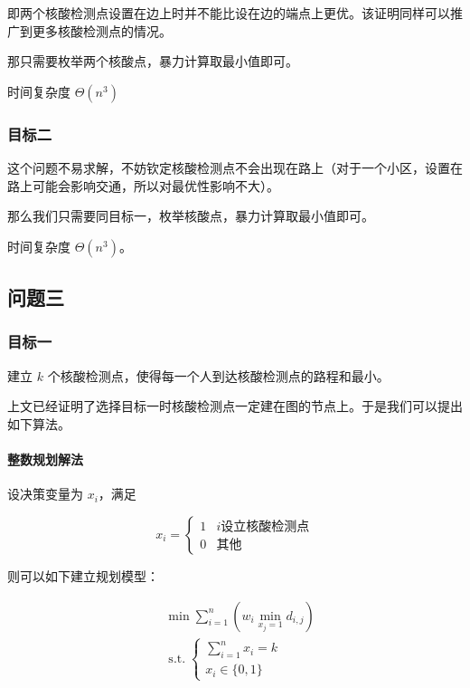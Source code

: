\documentclass{cumcmthesis}
\begin{document}
即两个核酸检测点设置在边上时并不能比设在边的端点上更优。该证明同样可以推广到更多核酸检测点的情况。

那只需要枚举两个核酸点，暴力计算取最小值即可。

时间复杂度 $\Theta(n^3)$

\subsubsection{目标二}

这个问题不易求解，不妨钦定核酸检测点不会出现在路上（对于一个小区，设置在路上可能会影响交通，所以对最优性影响不大）。

那么我们只需要同目标一，枚举核酸点，暴力计算取最小值即可。

时间复杂度 $\Theta(n^3)$。

\subsection{问题三}

\subsubsection{目标一}

建立 $k$ 个核酸检测点，使得每一个人到达核酸检测点的路程和最小。

上文已经证明了选择目标一时核酸检测点一定建在图的节点上。于是我们可以提出如下算法。


\paragraph{整数规划解法}

设决策变量为 $x_i$，满足

\begin{equation*}
    x_i=\begin{cases}
    1 & i \text{设立核酸检测点}\\
    0 & \text{其他}
    \end{cases}
\end{equation*}

则可以如下建立规划模型：

\begin{align*}
    &\min\sum_{i=1}^n \left(w_i \min_{x_j=1} d_{i,j}\right)\\
    &\operatorname{s.t.}\begin{cases}\sum_{i=1}^n x_i=k\\x_i\in\{0,1\}\end{cases}
\end{align*}
\end{document}
